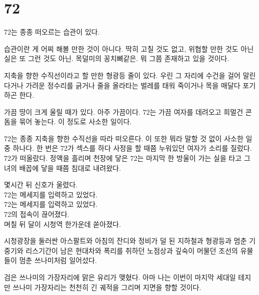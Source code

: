\documentclass[12pt, b6paper, openany]{memoir}
\newenvironment{lyric}{%
	\setlength{\parindent}{0pt}
}{}
\begin{document}
\begin{lyric}
\hypertarget{section}{%

\chapter{72}\label{section}}



72는 종종 떠오르는 습관이 있다.



습관이란 게 어찌 해볼 만한 것이 아니다. 딱히 고칠 것도 없고, 위협할 만한 것도 아닌 실은 또 그런 것도 아닌. 목덜미의 꽁치뼈같은. 뭐 그쯤 존재하고 있을 것이다.



지축을 향한 수직선이라고 할 만한 형광등 줄이 있다. 우린 그 자리에 수건을 걸어 말린 다거나 가려운 정수리를 긁거나 줄을 올라타는 벌레를 태워 죽이거나 목을 매달다 포기하곤 한다.



가끔 땅이 크게 울릴 때가 있다. 아주 가끔이다. 72는 가끔 여자를 데려오고 희멀건 콘돔을 묶어 놓는다. 이 정도로 사소한 일이다.



72는 종종 지축을 향한 수직선을 따라 떠오른다. 이 또한 뭐라 말할 것 없이 사소한 일 중 하나다. 한 번은 72가 섹스를 하다 사정을 할 때쯤 누워있던 여자가 소리를 질렀다. 72가 떠올랐다. 정액을 흘리며 천장에 닿은 72는 마지막 한 방울이 가는 실을 타고 그녀의 배꼽에 닿을 때쯤 침대로 내려왔다.



몇시간 뒤 신호가 울렸다.\\

72는 메세지를 입력하고 있었다.\\

72는 메세지를 입력하고 있었다.\\

72의 접속이 끊어졌다.\\

며칠 뒤 달이 시청역 한가운데 쏟아졌다.



시청광장을 둘러싼 아스팔트와 아침의 잔디와 정비가 덜 된 지하철과 형광등과 멈춘 기중기와 리스기간이 남은 현대차와 폭리를 취하던 노점상과 깊숙이 머물던 조선의 유물들이 멈춘 쓰나미처럼 일어섰다.



검은 쓰나미의 가장자리에 맑은 유리가 맺혔다. 아마 나는 이번이 마지막 세대일 테지만 쓰나미 가장자리는 천천히 긴 궤적을 그리며 지면을 향할 것이다.


\end{lyric}
\end{document}
